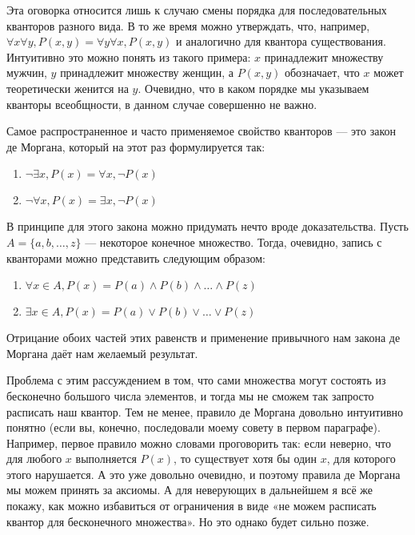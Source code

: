 Эта оговорка относится лишь к случаю смены порядка для последовательных кванторов разного вида. В то же время можно утверждать, что, например, $\forall x \forall y, P(x, y) = \forall y \forall x, P(x, y)$ и аналогично для квантора существования. Интуитивно это можно понять из такого примера: $x$ принадлежит множеству мужчин, $y$ принадлежит множеству женщин, а $P(x, y)$ обозначает, что $x$ может теоретически женится на $y$. Очевидно, что в каком порядке мы указываем кванторы всеобщности, в данном случае совершенно не важно.

Самое распространенное и часто применяемое свойство кванторов — это закон де Моргана, который на этот раз формулируется так:

\begin{enumerate}
\item   $\neg \exists x, P(x) = \forall x, \neg P(x)$
\item   $\neg \forall x, P(x) = \exists x, \neg P(x)$
\end{enumerate}

В принципе для этого закона можно придумать нечто вроде доказательства. Пусть $A = \{a, b, \ldots, z\}$ — некоторое конечное множество. Тогда, очевидно, запись с кванторами можно представить  следующим образом:

\begin{enumerate}
\item   $\forall x \in A, P(x) = P(a) \wedge P(b) \wedge \ldots \wedge P(z)$
\item   $\exists x \in A, P(x) = P(a) \vee P(b) \vee \ldots \vee P(z)$
\end{enumerate}

Отрицание обоих частей этих равенств и применение привычного нам закона де Моргана даёт нам желаемый результат.

Проблема с этим рассуждением в том, что сами множества могут состоять из бесконечно большого числа элементов, и тогда мы не сможем так запросто расписать наш квантор. Тем не менее, правило де Моргана довольно интуитивно понятно (если вы, конечно, последовали моему совету в первом параграфе). Например, первое правило можно словами проговорить так: если неверно, что для любого $x$ выполняется $P(x)$, то существует хотя бы один $x$, для которого этого нарушается. А это уже довольно очевидно, и поэтому правила де Моргана мы можем принять за аксиомы. А для неверующих в дальнейшем я всё же покажу, как можно избавиться от ограничения в виде «не можем расписать квантор для бесконечного множества». Но это однако будет сильно позже.



